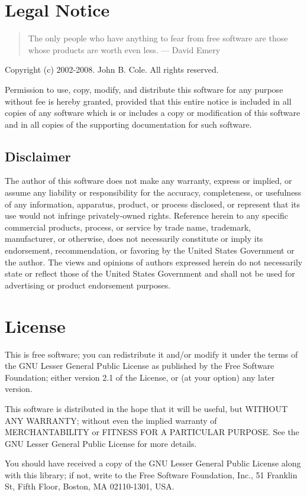 \section*{Legal Notice}
\begin{quote}
 The only people who have anything to fear from free software are those whose products are worth even less. --- David Emery
\end{quote}

\label{sec:legal-notice}
Copyright (c) 2002-2008.  John B. Cole.  All rights reserved.

Permission to use, copy, modify, and distribute this software for any purpose
without fee is hereby granted, provided that this entire notice is included in
all copies of any software which is or includes a copy or modification of this
software and in all copies of the supporting documentation for such software.

\subsection*{Disclaimer}
The author of this software does not make any warranty, express or implied, or
assume any liability or responsibility for the accuracy, completeness, or
usefulness of any information, apparatus, product, or process disclosed, or
represent that its use would not infringe privately-owned rights. Reference
herein to any specific commercial products, process, or service by trade name,
trademark, manufacturer, or otherwise, does not necessarily constitute or imply
its endorsement, recommendation, or favoring by the United States Government or
the author. The views and opinions of authors expressed herein do not necessarily
state or reflect those of the United States Government and shall not be used for
advertising or product endorsement purposes.

\section*{License}\label{sec:license}
This is free software; you can redistribute it and/or modify it
under the terms of the GNU Lesser General Public License as published by
the Free Software Foundation; either version 2.1 of the License, or (at
your option) any later version.

This software is distributed in the hope that it will be useful, but
WITHOUT ANY WARRANTY; without even the implied warranty of
MERCHANTABILITY or FITNESS FOR A PARTICULAR PURPOSE.  See the GNU
Lesser General Public License for more details.

You should have received a copy of the GNU Lesser General Public
License along with this library; if not, write to the Free Software
Foundation, Inc., 51 Franklin St, Fifth Floor, Boston, MA 02110-1301,
USA.